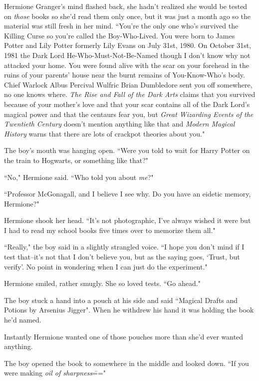Hermione Granger's mind flashed back, she hadn't realized she would be tested on \emph{those} books so she'd read them only once, but it was just a month ago so the material was still fresh in her mind. ``You're the only one who's survived the Killing Curse so you're called the Boy-Who-Lived. You were born to James Potter and Lily Potter formerly Lily Evans on July 31st, 1980. On October 31st, 1981 the Dark Lord He-Who-Must-Not-Be-Named though I don't know why not attacked your home. You were found alive with the scar on your forehead in the ruins of your parents' house near the burnt remains of You-Know-Who's body. Chief Warlock Albus Percival Wulfric Brian Dumbledore sent you off somewhere, no one knows where. \emph{The Rise and Fall of the Dark Arts} claims that you survived because of your mother's love and that your scar contains all of the Dark Lord's magical power and that the centaurs fear you, but \emph{Great Wizarding Events of the Twentieth Century} doesn't mention anything like that and \emph{Modern Magical History} warns that there are lots of crackpot theories about you."

The boy's mouth was hanging open. ``Were you told to wait for Harry Potter on the train to Hogwarts, or something like that?"

``No," Hermione said. ``Who told you about \emph{me}?"

``Professor McGonagall, and I believe I see why. Do you have an eidetic memory, Hermione?"

Hermione shook her head. ``It's not photographic, I've always wished it were but I had to read my school books five times over to memorize them all."

``Really," the boy said in a slightly strangled voice. ``I hope you don't mind if I test that\---it's not that I don't believe you, but as the saying goes, `Trust, but verify'. No point in wondering when I can just do the experiment."

Hermione smiled, rather smugly. She so loved tests. ``Go ahead."

The boy stuck a hand into a pouch at his side and said ``Magical Drafts and Potions by Arsenius Jigger". When he withdrew his hand it was holding the book he'd named.

Instantly Hermione wanted one of those pouches more than she'd ever wanted anything.

The boy opened the book to somewhere in the middle and looked down. ``If you were making \emph{oil of sharpness}\==="

